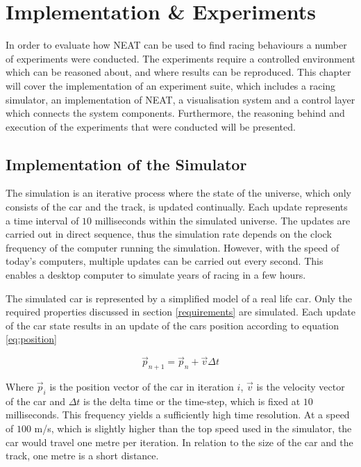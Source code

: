 
\chapter{Implementation \& Experiments}
In order to evaluate how NEAT can be used to find racing behaviours a number of experiments were conducted. The experiments require a controlled environment which can be reasoned about, and where results can be reproduced. This chapter will cover the implementation of an experiment suite, which includes a racing simulator, an implementation of NEAT, a visualisation system and a control layer which connects the system components. Furthermore, the reasoning behind and execution of the experiments that were conducted will be presented. 



\section{Implementation of the Simulator}

The simulation is an iterative process where the state of the universe, which only consists of the car and the track, is updated continually. Each update represents a time interval of $10$ milliseconds within the simulated universe. The updates are carried out in direct sequence, thus the simulation rate depends on the clock frequency of the computer running the simulation. However, with the speed of today's computers, multiple updates can be carried out every second. This enables a desktop computer to simulate years of racing in a few hours. 

The simulated car is represented by a simplified model of a real life car. Only the required properties discussed in section \ref{requirements} are simulated. Each update of the car state results in an update of the cars position according to equation \ref{eq:position}

\begin{equation}
    \vec{p}_{n+1} = \vec{p}_{n} + \vec{v}\Delta t 
    \label{eq:position}
\end{equation}

\noindent
Where $\vec{p}_i$ is the position vector of the car in iteration $i$, $\vec{v}$ is the velocity vector of the car and $\Delta t$ is the delta time or the time-step, which is fixed at $10$ milliseconds. This frequency yields a sufficiently high time resolution. At a speed of $100$ m/s, which is slightly higher than the top speed used in the simulator, the car would travel one metre per iteration. In relation to the size of the car and the track, one metre is a short distance.

